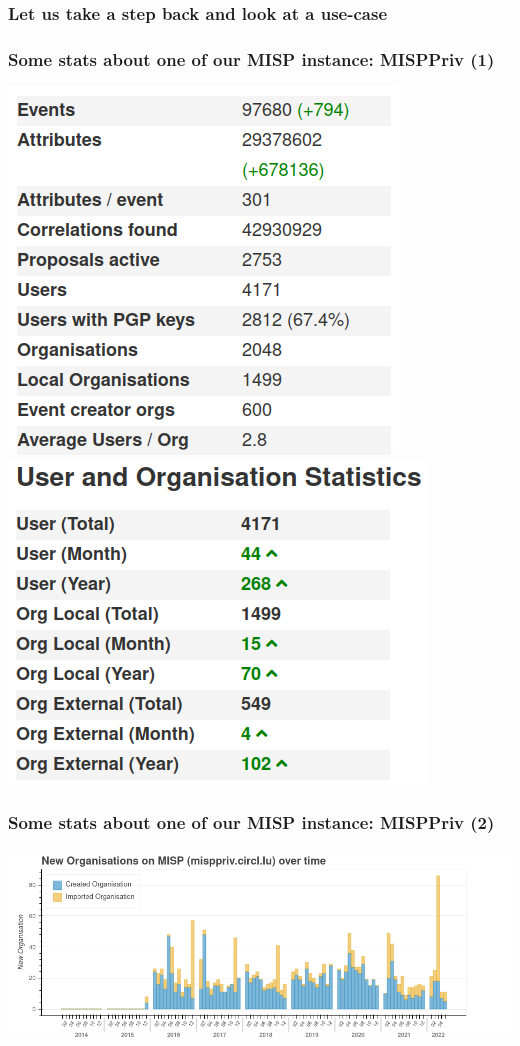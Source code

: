 \begin{frame}
\frametitle{Let us take a step back and look at a use-case}
\end{frame}


\begin{frame}
\frametitle{Some stats about one of our MISP instance: MISPPriv (1)}
    \includegraphics[width=0.45\linewidth]{pictures/misppriv-usage.png}
    \includegraphics[width=0.45\linewidth]{pictures/misppriv-user-org-stats.png}
\end{frame}

\begin{frame}
    \frametitle{Some stats about one of our MISP instance: MISPPriv (2)}
    \begin{center}
        \includegraphics[width=1.1\linewidth]{pictures/bokeh_new_org.png}
    \end{center}
\end{frame}

